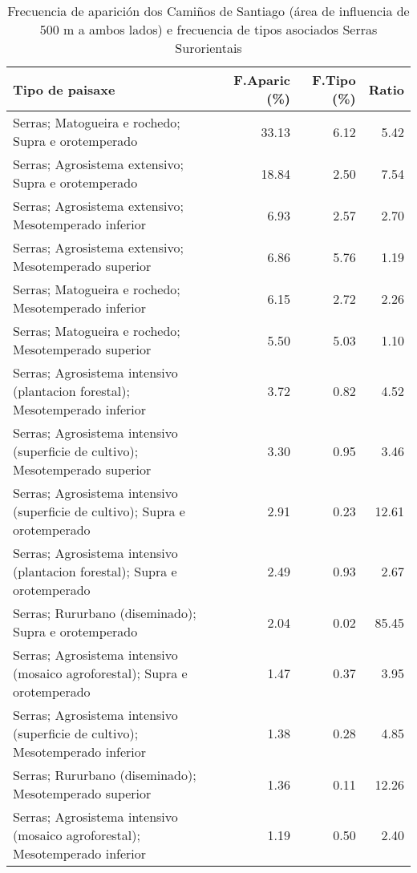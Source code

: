 \begin{table}[p]
\centering
\caption{Frecuencia de aparición dos Camiños de Santiago (área de influencia de 500 m a ambos lados) e frecuencia de tipos asociados Serras Surorientais} 
\label{vcamino9}
\begin{tabular}{lrrr}
  \hline
Tipo de paisaxe & F.Aparic (\%) & F.Tipo (\%) & Ratio \\ 
  \hline
Serras; Matogueira e rochedo; Supra e orotemperado & 33.13 & 6.12 & 5.42 \\ 
  Serras; Agrosistema extensivo; Supra e orotemperado & 18.84 & 2.50 & 7.54 \\ 
  Serras; Agrosistema extensivo; Mesotemperado inferior & 6.93 & 2.57 & 2.70 \\ 
  Serras; Agrosistema extensivo; Mesotemperado superior & 6.86 & 5.76 & 1.19 \\ 
  Serras; Matogueira e rochedo; Mesotemperado inferior & 6.15 & 2.72 & 2.26 \\ 
  Serras; Matogueira e rochedo; Mesotemperado superior & 5.50 & 5.03 & 1.10 \\ 
  Serras; Agrosistema intensivo (plantacion forestal); Mesotemperado inferior & 3.72 & 0.82 & 4.52 \\ 
  Serras; Agrosistema intensivo (superficie de cultivo); Mesotemperado superior & 3.30 & 0.95 & 3.46 \\ 
  Serras; Agrosistema intensivo (superficie de cultivo); Supra e orotemperado & 2.91 & 0.23 & 12.61 \\ 
  Serras; Agrosistema intensivo (plantacion forestal); Supra e orotemperado & 2.49 & 0.93 & 2.67 \\ 
  Serras; Rururbano (diseminado); Supra e orotemperado & 2.04 & 0.02 & 85.45 \\ 
  Serras; Agrosistema intensivo (mosaico agroforestal); Supra e orotemperado & 1.47 & 0.37 & 3.95 \\ 
  Serras; Agrosistema intensivo (superficie de cultivo); Mesotemperado inferior & 1.38 & 0.28 & 4.85 \\ 
  Serras; Rururbano (diseminado); Mesotemperado superior & 1.36 & 0.11 & 12.26 \\ 
  Serras; Agrosistema intensivo (mosaico agroforestal); Mesotemperado inferior & 1.19 & 0.50 & 2.40 \\ 
   \hline
\end{tabular}
\end{table}

